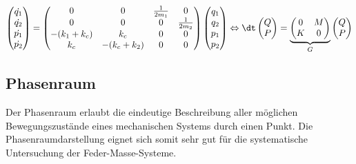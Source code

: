 \begin{equation}
    \label{kra:hamilton:multispringmass}
    \begin{pmatrix}
        \dot{q_1} \\
        \dot{q_2} \\
        \dot{p_1} \\
        \dot{p_2} \\
    \end{pmatrix}
    =
    \begin{pmatrix}
        0            & 0            & \frac{1}{2m_1} & 0              \\
        0            & 0            & 0              & \frac{1}{2m_2} \\
        -(k_1 + k_c) & k_c          & 0              & 0              \\
        k_c          & -(k_c + k_2) & 0              & 0              \\
    \end{pmatrix}
    \begin{pmatrix}
        q_1 \\
        q_2 \\
        p_1 \\
        p_2 \\
    \end{pmatrix}
    \Leftrightarrow
    \dt
    \begin{pmatrix}
        Q \\
        P \\
    \end{pmatrix}
    =
    \underbrace{
        \begin{pmatrix}
            0 & M \\
            K & 0
        \end{pmatrix}
    }_{G}
    \begin{pmatrix}
        Q \\
        P \\
    \end{pmatrix}
\end{equation}

\subsection{Phasenraum}
Der Phasenraum erlaubt die eindeutige Beschreibung aller möglichen Bewegungszustände eines mechanischen Systems durch einen Punkt.
Die Phasenraumdarstellung eignet sich somit sehr gut für die systematische Untersuchung der Feder-Masse-Systeme.

